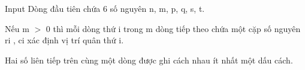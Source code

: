 Input
Dòng đầu tiên chứa 6 số nguyên n, m, p, q, s, t.

Nếu m $>$ 0 thì mỗi dòng thứ i trong m dòng tiếp theo chứa một cặp số nguyên ri , ci xác định vị trí quân thứ i.

Hai số liên tiếp trên cùng một dòng được ghi cách nhau ít nhất một dấu cách.